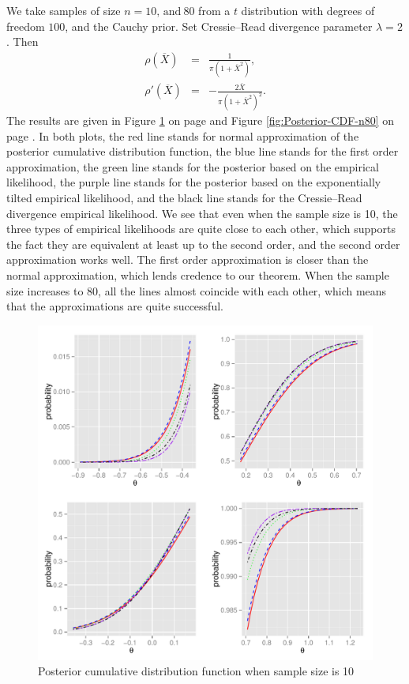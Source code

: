 We take  samples of size $n=10,\mathrm{\, and}\:80$ from a $t$ distribution
with degrees of freedom $100$, and the Cauchy prior.
Set Cressie--Read divergence parameter $\lambda=2$ . Then 
\begin{eqnarray*}
\rho\left(\overline{X}\right) & = & \frac{1}{\pi\left(1+\overline{X}^{2}\right)},\\
\rho'\left(\overline{X}\right) & = & -\frac{2\overline{X}}{\pi\left(1+\overline{X}^{2}\right)^{2}}.
\end{eqnarray*}
The results are given in Figure \ref{fig:Posterior-CDF-n10} on page \pageref{fig:Posterior-CDF-n10} and Figure \ref{fig:Posterior-CDF-n80} on page \pageref{fig:Posterior-CDF-n80}.
In both plots, the red line stands for normal approximation of the posterior
cumulative distribution function, the blue line stands for the first
order approximation, the green line stands for the posterior based
on the empirical likelihood, the purple line stands for the posterior
based on the exponentially tilted empirical likelihood, and   the black line
stands for the Cressie--Read divergence empirical likelihood. We 
see that even when the sample size is 10, the three types of empirical
likelihoods are quite close to each other, which supports the fact
they are equivalent  at least up to the second order, and the second order
 approximation works well. The first order approximation is closer
than the normal approximation, which lends credence to our theorem.
When the sample size increases to 80, all the lines almost coincide
with each other, which means that the approximations are quite successful.
\begin{figure}[H]

\begin{center}
\includegraphics[scale=0.5]{n10bw.pdf}\protect\caption{Posterior cumulative distribution function when sample size is 10\label{fig:Posterior-CDF-n10}}
\end{center}

\end{figure}
